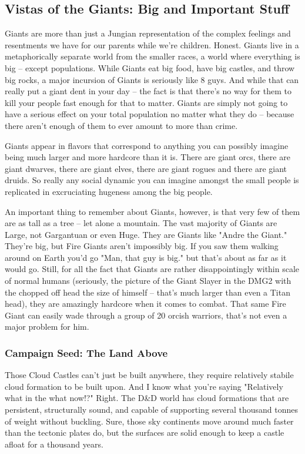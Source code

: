 \subsection{Vistas of the Giants: Big and Important Stuff}

Giants are more than just a Jungian representation of the complex feelings and resentments we have for our parents while we're children. Honest. Giants live in a metaphorically separate world from the smaller races, a world where everything is big -- except populations. While Giants eat big food, have big castles, and throw big rocks, a major incursion of Giants is seriously like 8 guys. And while that can really put a giant dent in your day -- the fact is that there's no way for them to kill your people fast enough for that to matter. Giants are simply not going to have a serious effect on your total population no matter what they do -- because there aren't enough of them to ever amount to more than crime.

Giants appear in flavors that correspond to anything you can possibly imagine being much larger and more hardcore than it is. There are giant orcs, there are giant dwarves, there are giant elves, there are giant rogues and there are giant druids. So really any social dynamic you can imagine amongst the small people is replicated in excruciating hugeness among the big people.

An important thing to remember about Giants, however, is that very few of them are as tall as a tree -- let alone a mountain. The vast majority of Giants are Large, not Gargantuan or even Huge. They are Giants like "Andre the Giant." They're big, but Fire Giants aren't impossibly big. If you saw them walking around on Earth you'd go "Man, that guy is big." but that's about as far as it would go. Still, for all the fact that Giants are rather disappointingly within scale of normal humans (seriously, the picture of the Giant Slayer in the DMG2 with the chopped off head the size of himself -- that's much larger than even a Titan head), they are amazingly hardcore when it comes to combat. That same Fire Giant can easily wade through a group of 20 orcish warriors, that's not even a major problem for him.

\subsubsection{Campaign Seed: The Land Above}
Those Cloud Castles can't just be built anywhere, they require relatively stabile cloud formation to be built upon. And I know what you're saying "Relatively what in the what now!?" Right. The D\&D world has cloud formations that are persistent, structurally sound, and capable of supporting several thousand tonnes of weight without buckling. Sure, those sky continents move around much faster than the tectonic plates do, but the surfaces are solid enough to keep a castle afloat for a thousand years.

